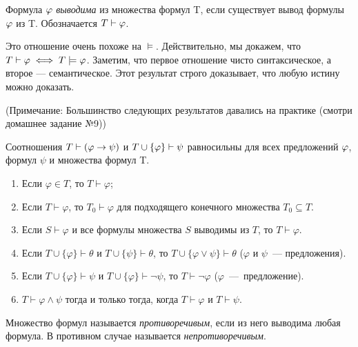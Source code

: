 \begin{definition}
    Формула $\vfi$ \emph{выводима} из множества формул T, если существует вывод формулы $\vfi$ из T. Обозначается $T\vdash \vfi$.
\end{definition}

\begin{remark}
Это отношение очень похоже на $\models$. Действительно, мы докажем, что $T\vdash\vfi \iff T\models\vfi$. Заметим, что первое отношение чисто синтаксическое, а второе — семантическое. Этот результат строго доказывает, что любую истину можно доказать.
\end{remark}

(Примечание: Большинство следующих результатов давались на практике (смотри домашнее задание №9))

\begin{prop}
    \begin{theorem}[о дедукции]
        Соотношения $T\vdash (\vfi\to\psi)$ и $T\cup\set*{\vfi}\vdash \psi$ равносильны для всех предложений $\vfi$, формул $\psi$ и множества формул T.
    \end{theorem}

    \begin{enumerate}
	    \item Если $\varphi \in T$, то $T\vdash\varphi$;
	    \item Если $T \vdash\varphi$, то $T_0 \vdash \varphi$ для подходящего конечного множества $T_0 \subseteq T$. 
	    \item Если $S \vdash \varphi$ и все формулы множества $S$ выводимы из $T$, то $T\vdash\varphi$. 
	    \item Если $T\cup\{\varphi\} \vdash \theta$ и $T\cup\{\psi\} \vdash \theta$, то $T\cup\{\varphi\lor\psi\}\vdash \theta$ ($\varphi$ и $\psi$~— предложения). 
	    \item Если $T\cup\{\varphi\}\vdash \psi$ и $T\cup\{\varphi\}\vdash\neg\psi$, то $T\vdash\neg\varphi$ ($\varphi$~— предложение). 
	    \item $T\vdash\varphi \land \psi$ тогда и только тогда, когда $T\vdash\varphi$ и $T\vdash\psi$.
    \end{enumerate}
\end{prop}

\begin{definition}
    Множество формул называется \emph{противоречивым}, если из него выводима любая формула. В противном случае называется \emph{непротиворечивым}.
\end{definition}

